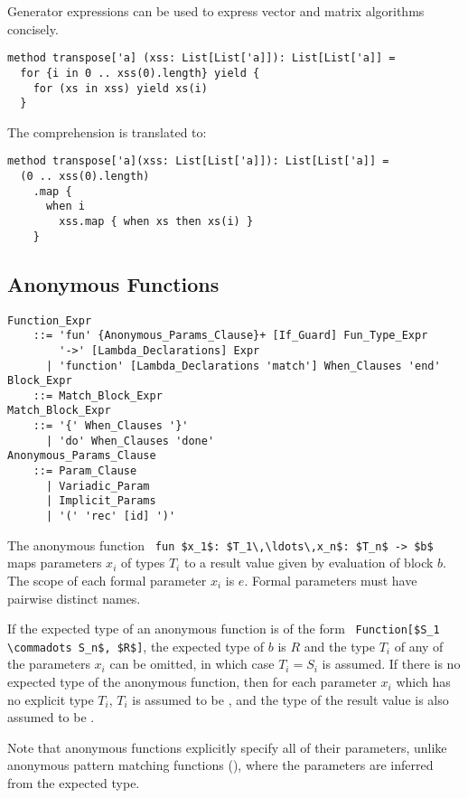 \example Generator expressions can be used to express vector and matrix algorithms concisely.
\begin{lstlisting}
method transpose['a] (xss: List[List['a]]): List[List['a]] =
  for {i in 0 .. xss(0).length} yield {
    for (xs in xss) yield xs(i)
  }
\end{lstlisting} 
The comprehension is translated to: 
\begin{lstlisting}
method transpose['a](xss: List[List['a]]): List[List['a]] = 
  (0 .. xss(0).length)
    .map { 
      when i 
        xss.map { when xs then xs(i) }
    }
\end{lstlisting}






\subsection{Anonymous Functions}
\label{sec:anonymous-functions}

\grammar\begin{lstlisting}
Function_Expr
    ::= 'fun' {Anonymous_Params_Clause}+ [If_Guard] Fun_Type_Expr
        '->' [Lambda_Declarations] Expr
      | 'function' [Lambda_Declarations 'match'] When_Clauses 'end'
Block_Expr
    ::= Match_Block_Expr
Match_Block_Expr
    ::= '{' When_Clauses '}'
      | 'do' When_Clauses 'done'
Anonymous_Params_Clause
    ::= Param_Clause
      | Variadic_Param
      | Implicit_Params
      | '(' 'rec' [id] ')'
\end{lstlisting}

The anonymous function ~\lstinline!fun $x_1$: $T_1\,\ldots\,x_n$: $T_n$ -> $b$!~ maps parameters $x_i$ of types $T_i$ to a result value given by evaluation of block $b$. The scope of each formal parameter $x_i$ is $e$. Formal parameters must have pairwise distinct names.

If the expected type of an anonymous function is of the form ~\lstinline!Function[$S_1 \commadots S_n$, $R$]!, the expected type of $b$ is $R$ and the type $T_i$ of any of the parameters $x_i$ can be omitted, in which case $T_i = S_i$ is assumed. If there is no expected type of the anonymous function, then for each parameter $x_i$ which has no explicit type $T_i$, $T_i$ is assumed to be , and the type of the result value is also assumed to be . 

Note that anonymous functions explicitly specify all of their parameters, unlike anonymous pattern matching functions (), where the parameters are inferred from the expected type. 

